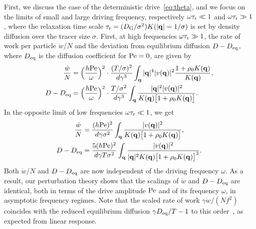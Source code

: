 \documentclass[superscriptaddress, twocolumn, prx, longbibliography, nofootinbib]{revtex4-1}
\begin{document}
First, we discuss the case of the deterministic drive~\eqref{eq:theta}, and we focus on the limits of small and large driving frequency, respectively $\omega\tau_{\rm r}\ll 1$ and $\omega\tau_{\rm r}\gg 1$, where the relaxation time scale $\tau_{\rm r}=(D_{\rm G}/\sigma^2)K(|{\bf q}|=1/\sigma)$ is set by density diffusion over the tracer size $\sigma$. First, at high frequencies $\omega\tau_{\rm r}\gg 1$, the rate of work per particle $\dot w/N$ and the deviation from equilibrium diffusion $D-D_{\rm eq}$, where $D_{\rm eq}$ is the diffusion coefficient for ${\rm Pe}=0$, are given by
\begin{equation}\label{eq:large}
	\begin{aligned}
		\frac{\dot w}{N} &= \Big(\frac{h{\rm Pe}}{\omega}\Big)^2 \cdot \frac{(T/\sigma)^2}{d\gamma^3} \int_{\bf q} |{\bf q}|^4 |v({\bf q})|^2 \frac{1 + \rho_0K({\bf q})}{K({\bf q})} ,
		\\
		D-D_{\rm eq} &= \Big(\frac{h{\rm Pe}}{\omega}\Big)^2 \cdot \frac{T /\sigma^2}{d\gamma^3} \int_{\bf q}\frac{|{\bf q}|^2 |v({\bf q})|^2 } {K({\bf q})\big[1 + \rho_0 K({\bf q})\big]} .
	\end{aligned}
\end{equation}
In the opposite limit of low frequencies $\omega\tau_{\rm r}\ll 1$, we get
\begin{equation}\label{eq:small}
	\begin{aligned}
		\frac{\dot w}{N} &= \frac{(h{\rm Pe})^2}{d\gamma\sigma^2} \int_{\bf q} \frac{|v({\bf q})|^2}{K({\bf q})\big[1 + \rho_0K({\bf q})\big]} ,
		\\
		D - D_{\rm eq} &= \frac{5(h{\rm Pe})^2}{d\gamma T\sigma^2} \int_{\bf q} \frac{|v({\bf q})|^2}{|{\bf q}|^2K({\bf q})\big[1 + \rho_0K({\bf q})\big]^3} .
	\end{aligned}
\end{equation}
Both $\dot w/N$ and $D-D_{\rm eq}$ are now independent of the driving frequency $\omega$. As a result, our perturbation theory shows that the scalings of $\dot w$ and $D-D_{\rm eq}$ are identical, both in terms of the drive amplitude $\rm Pe$ and of its frequency $\omega$, in asymptotic frequency regimes. Note that the scaled rate of work $\gamma\dot w/(Nf^2)$ coincides with the reduced equilibrium diffusion $\gamma D_{\rm eq}/T-1$ to this order~\cite{Demery2011, Demery2014}, as expected from linear response.
\end{document}
